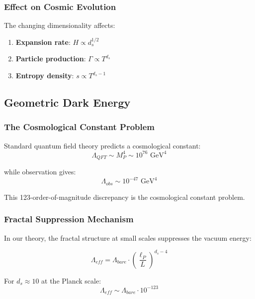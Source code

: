 \subsubsection{Effect on Cosmic Evolution}

The changing dimensionality affects:
\begin{enumerate}
    \item \textbf{Expansion rate}: $H \propto d_s^{1/2}$
    \item \textbf{Particle production}: $\Gamma \propto T^{d_s}$
    \item \textbf{Entropy density}: $s \propto T^{d_s-1}$
\end{enumerate}

\subsection{Geometric Dark Energy}

\subsubsection{The Cosmological Constant Problem}

Standard quantum field theory predicts a cosmological constant:
\begin{equation}
    \Lambda_{QFT} \sim M_P^4 \sim 10^{76} \text{ GeV}^4
\end{equation}

while observation gives:
\begin{equation}
    \Lambda_{obs} \sim 10^{-47} \text{ GeV}^4
\end{equation}

This 123-order-of-magnitude discrepancy is the cosmological constant problem.

\subsubsection{Fractal Suppression Mechanism}

In our theory, the fractal structure at small scales suppresses the vacuum energy:

\begin{equation}
    \Lambda_{eff} = \Lambda_{bare} \cdot \left(\frac{\ell_P}{L}\right)^{d_s - 4}
\end{equation}

For $d_s \approx 10$ at the Planck scale:
\begin{equation}
    \Lambda_{eff} \sim \Lambda_{bare} \cdot 10^{-123}
\end{equation}

